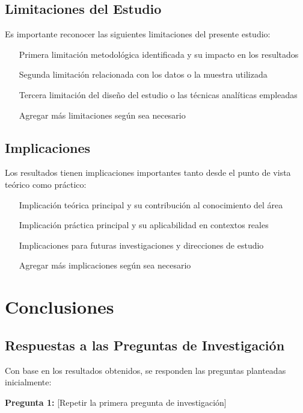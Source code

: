 \documentclass[12pt, letterpaper]{article}
\begin{document}
\subsection{Limitaciones del Estudio}

Es importante reconocer las siguientes limitaciones del presente estudio:

\begin{itemize}
    \item [Primera limitación metodológica identificada y su impacto en los resultados]
    \item [Segunda limitación relacionada con los datos o la muestra utilizada]
    \item [Tercera limitación del diseño del estudio o las técnicas analíticas empleadas]
    \item [Agregar más limitaciones según sea necesario]
\end{itemize}

\subsection{Implicaciones}

Los resultados tienen implicaciones importantes tanto desde el punto de vista teórico como práctico:

\begin{itemize}
    \item [Implicación teórica principal y su contribución al conocimiento del área]
    \item [Implicación práctica principal y su aplicabilidad en contextos reales]
    \item [Implicaciones para futuras investigaciones y direcciones de estudio]
    \item [Agregar más implicaciones según sea necesario]
\end{itemize}

\section{Conclusiones}

\subsection{Respuestas a las Preguntas de Investigación}

Con base en los resultados obtenidos, se responden las preguntas planteadas inicialmente:

\textbf{Pregunta 1:} [Repetir la primera pregunta de investigación]
\end{document}
